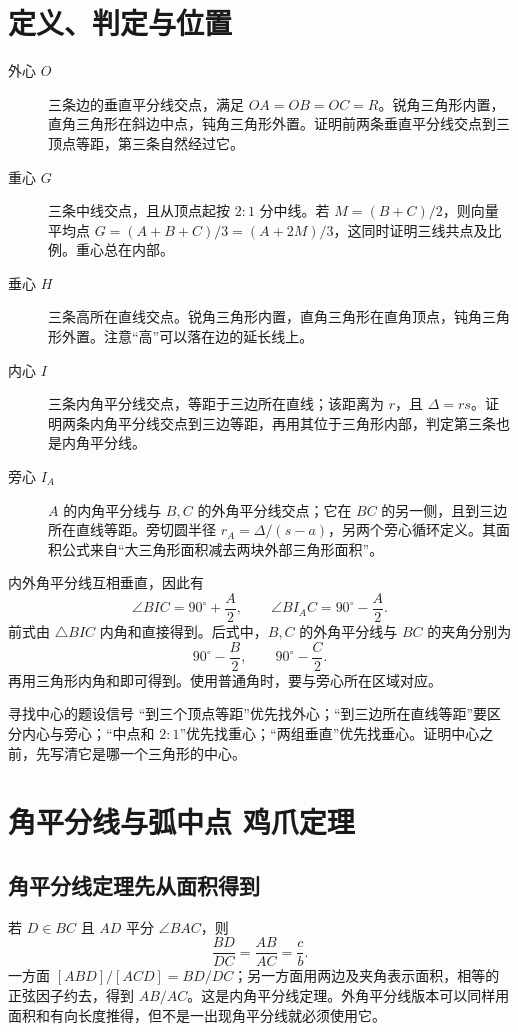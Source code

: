 \documentclass[lang=cn,12pt,fontset=none,a4paper,openany]{beautybook}
\begin{document}
\section{定义、判定与位置}
\begin{description}
\item[外心 $O$] 三条边的垂直平分线交点，满足 $OA=OB=OC=R$。锐角三角形内置，直角三角形在斜边中点，钝角三角形外置。证明前两条垂直平分线交点到三顶点等距，第三条自然经过它。
\item[重心 $G$] 三条中线交点，且从顶点起按 $2:1$ 分中线。若 $M=(B+C)/2$，则向量平均点 $G=(A+B+C)/3=(A+2M)/3$，这同时证明三线共点及比例。重心总在内部。
\item[垂心 $H$] 三条高所在直线交点。锐角三角形内置，直角三角形在直角顶点，钝角三角形外置。注意“高”可以落在边的延长线上。
\item[内心 $I$] 三条内角平分线交点，等距于三边所在直线；该距离为 $r$，且 $\Delta=rs$。证明两条内角平分线交点到三边等距，再用其位于三角形内部，判定第三条也是内角平分线。
\item[旁心 $I_A$] $A$ 的内角平分线与 $B,C$ 的外角平分线交点；它在 $BC$ 的另一侧，且到三边所在直线等距。旁切圆半径 $r_A=\Delta/(s-a)$，另两个旁心循环定义。其面积公式来自“大三角形面积减去两块外部三角形面积”。
\end{description}
内外角平分线互相垂直，因此有
\[
 \angle BIC=90^\circ+\frac A2,\qquad
 \angle BI_AC=90^\circ-\frac A2.
\]
前式由 $\triangle BIC$ 内角和直接得到。后式中，$B,C$ 的外角平分线与 $BC$ 的夹角分别为
\[90^\circ-\frac B2,\qquad90^\circ-\frac C2.\]
再用三角形内角和即可得到。使用普通角时，要与旁心所在区域对应。

\begin{keybox}{寻找中心的题设信号}
“到三个顶点等距”优先找外心；“到三边所在直线等距”要区分内心与旁心；“中点和 $2:1$”优先找重心；“两组垂直”优先找垂心。证明中心之前，先写清它是哪一个三角形的中心。
\end{keybox}

\section{角平分线与弧中点 鸡爪定理}
\subsection{角平分线定理先从面积得到}
若 $D\in BC$ 且 $AD$ 平分 $\angle BAC$，则
\[
 \frac{BD}{DC}=\frac{AB}{AC}=\frac cb.
\]
一方面 $[ABD]/[ACD]=BD/DC$；另一方面用两边及夹角表示面积，相等的正弦因子约去，得到 $AB/AC$。这是内角平分线定理。外角平分线版本可以同样用面积和有向长度推得，但不是一出现角平分线就必须使用它。
\end{document}
